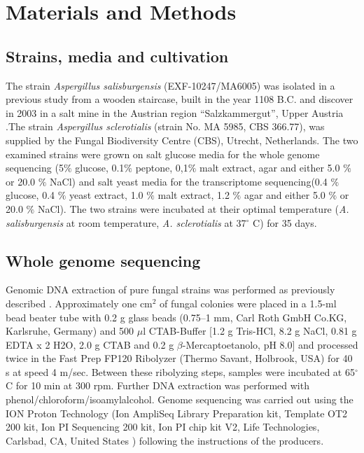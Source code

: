 \documentclass[jof,article,submit,moreauthors,pdftex,10pt,a4paper]{Definitions/mdpi}
\begin{document}
\section{Materials and Methods}
\subsection{Strains, media and cultivation}
The strain \textit{Aspergillus salisburgensis} (EXF-10247/MA6005) was isolated in a previous study from a wooden staircase, built in the year 1108 B.C. and discover in 2003 in a salt mine in the Austrian region “Salzkammergut”, Upper Austria \cite{Pinar2016}.The strain \textit{Aspergillus sclerotialis} (strain No. MA 5985, CBS 366.77), was supplied by the Fungal Biodiversity Centre (CBS), Utrecht, Netherlands.
The two examined strains were grown on salt glucose media for the whole genome sequencing (5$\%$ glucose, 0.1$\%$ peptone, 0,1$\%$ malt extract, agar and either 5.0 $\%$ or 20.0 $\%$ NaCl) and salt yeast media for the transcriptome sequencing(0.4 $\%$ glucose, 0.4 $\%$ yeast extract, 1.0 $\%$ malt extract, 1.2 $\%$ agar and either 5.0 $\%$ or 20.0 $\%$ NaCl). The two strains were incubated at their optimal temperature (\textit{A. salisburgensis} at room temperature,  \textit{A. sclerotialis} at  37$^{\circ}$ C) for 35 days.
\subsection{Whole genome sequencing}
Genomic DNA extraction of pure fungal strains was performed as previously described \cite{Sert2010AMonuments}. Approximately one cm$^{2}$ of fungal colonies were placed in a 1.5-ml bead beater tube with 0.2 g glass beads (0.75–1 mm, Carl Roth GmbH Co.KG, Karlsruhe, Germany) and 500 $\mu$l CTAB-Buffer [1.2 g Tris-HCl, 8.2 g NaCl, 0.81 g EDTA x 2 H2O, 2.0 g CTAB and 0.2 g $\beta$-Mercaptoetanolo, pH 8.0] and processed twice in the Fast Prep FP120 Ribolyzer (Thermo Savant, Holbrook, USA) for 40 s at speed 4 m/sec. Between these ribolyzing steps, samples were incubated at 65$^{\circ}$ C for 10 min at 300 rpm. Further DNA extraction was performed with  phenol/chloroform/isoamylalcohol. 
Genome sequencing was carried out using the ION Proton Technology (Ion AmpliSeq Library Preparation kit, Template OT2 200 kit, Ion PI Sequencing 200 kit, Ion PI chip kit V2, Life Technologies, Carlsbad, CA, United States ) following the instructions of the producers.
\end{document}
